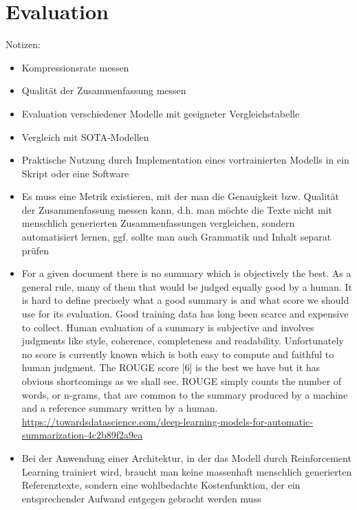 \section{Evaluation}
Notizen:
\begin{itemize}
	\item Kompressionsrate messen
	\item Qualität der Zusammenfassung messen
	\item Evaluation verschiedener Modelle mit geeigneter Vergleichstabelle
	\item Vergleich mit SOTA-Modellen
	\item Praktische Nutzung durch Implementation eines vortrainierten Modells in ein Skript oder eine Software
	\item Es muss eine Metrik existieren, mit der man die Genauigkeit bzw. Qualität der Zusammenfassung messen kann, d.h. man möchte die Texte nicht mit menschlich generierten Zusammenfassungen vergleichen, sondern automatisiert lernen, ggf. sollte man auch Grammatik und Inhalt separat prüfen
	\item For a given document there is no summary which is objectively the best. As a general rule, many of them that would be judged equally good by a human. It is hard to define precisely what a good summary is and what score we should use for its evaluation. Good training data has long been scarce and expensive to collect. Human evaluation of a summary is subjective and involves judgments like style, coherence, completeness and readability. Unfortunately no score is currently known which is both easy to compute and faithful to human judgment. The ROUGE score [6] is the best we have but it has obvious shortcomings as we shall see. ROUGE simply counts the number of words, or n-grams, that are common to the summary produced by a machine and a reference summary written by a human. \url{https://towardsdatascience.com/deep-learning-models-for-automatic-summarization-4c2b89f2a9ea}
	\item Bei der Anwendung einer Architektur, in der das Modell durch Reinforcement Learning trainiert wird, braucht man keine massenhaft menschlich generierten Referenztexte, sondern eine wohlbedachte Kostenfunktion, der ein entsprechender Aufwand entgegen gebracht werden muss
\end{itemize}
